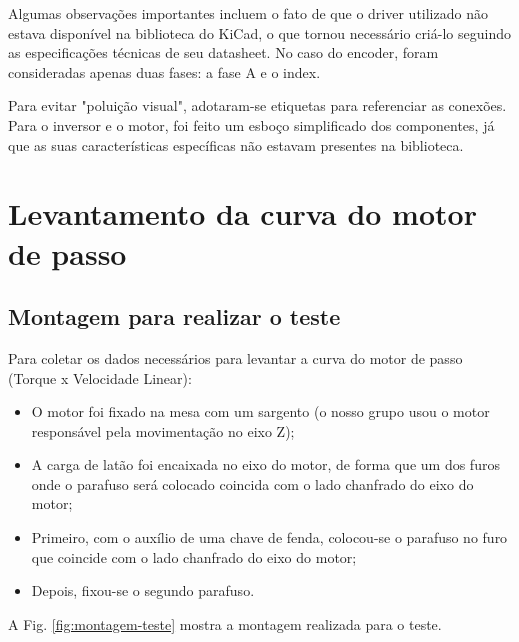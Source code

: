 Algumas observações importantes incluem o fato de que o driver utilizado não estava disponível na biblioteca do KiCad, o que tornou necessário criá-lo seguindo as especificações técnicas de seu datasheet. No caso do encoder, foram consideradas apenas duas fases: a fase A e o index.

Para evitar "poluição visual", adotaram-se etiquetas para referenciar as conexões. Para o inversor e o motor, foi feito um esboço simplificado dos componentes, já que as suas características específicas não estavam presentes na biblioteca.


\section{Levantamento da curva do motor de passo}


\subsection{Montagem para realizar o teste}

Para coletar os dados necessários para levantar a curva do motor de passo (Torque x Velocidade Linear):

\begin{itemize}
    \item O motor foi fixado na mesa com um sargento (o nosso grupo usou o motor responsável pela movimentação no eixo Z);
    \item A carga de latão foi encaixada no eixo do motor, de forma que um dos furos onde o parafuso será colocado coincida com o lado chanfrado do eixo do motor;
    \item Primeiro, com o auxílio de uma chave de fenda, colocou-se o parafuso no furo que coincide com o lado chanfrado do eixo do motor;
    \item Depois, fixou-se o segundo parafuso.
\end{itemize}

A Fig. \ref{fig:montagem-teste} mostra a montagem realizada para o teste.

